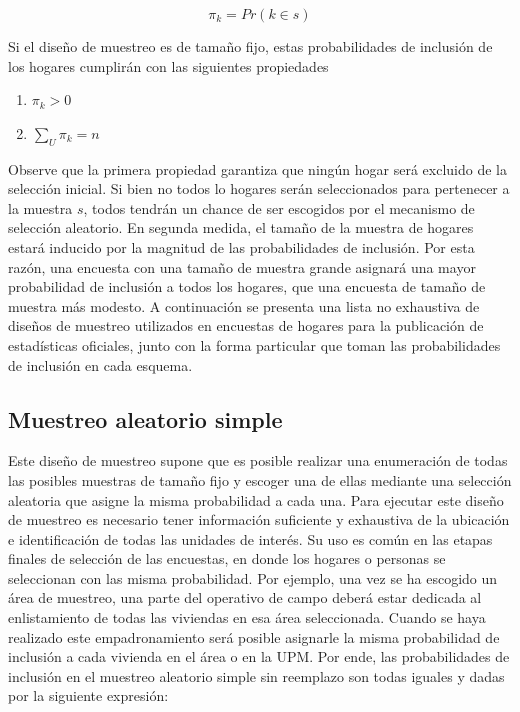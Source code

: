 \documentclass[
  12pt,
  spanish,
]{book}
\providecommand{\tightlist}{%
  \setlength{\itemsep}{0pt}\setlength{\parskip}{0pt}}
\begin{document}
\[\pi_k = Pr (k \in s)\]

Si el diseño de muestreo es de tamaño fijo, estas probabilidades de inclusión de los hogares cumplirán con las siguientes propiedades

\begin{enumerate}
\def\labelenumi{\arabic{enumi}.}
\tightlist
\item
  \(\pi_k > 0\)
\item
  \(\sum_U \pi_k = n\)
\end{enumerate}

Observe que la primera propiedad garantiza que ningún hogar será excluido de la selección inicial. Si bien no todos lo hogares serán seleccionados para pertenecer a la muestra \(s\), todos tendrán un chance de ser escogidos por el mecanismo de selección aleatorio. En segunda medida, el tamaño de la muestra de hogares estará inducido por la magnitud de las probabilidades de inclusión. Por esta razón, una encuesta con una tamaño de muestra grande asignará una mayor probabilidad de inclusión a todos los hogares, que una encuesta de tamaño de muestra más modesto. A continuación se presenta una lista no exhaustiva de diseños de muestreo utilizados en encuestas de hogares para la publicación de estadísticas oficiales, junto con la forma particular que toman las probabilidades de inclusión en cada esquema.

\hypertarget{muestreo-aleatorio-simple}{%
\subsection{Muestreo aleatorio simple}\label{muestreo-aleatorio-simple}}

Este diseño de muestreo supone que es posible realizar una enumeración de todas las posibles muestras de tamaño fijo y escoger una de ellas mediante una selección aleatoria que asigne la misma probabilidad a cada una. Para ejecutar este diseño de muestreo es necesario tener información suficiente y exhaustiva de la ubicación e identificación de todas las unidades de interés. Su uso es común en las etapas finales de selección de las encuestas, en donde los hogares o personas se seleccionan con las misma probabilidad. Por ejemplo, una vez se ha escogido un área de muestreo, una parte del operativo de campo deberá estar dedicada al enlistamiento de todas las viviendas en esa área seleccionada. Cuando se haya realizado este empadronamiento será posible asignarle la misma probabilidad de inclusión a cada vivienda en el área o en la UPM. Por ende, las probabilidades de inclusión en el muestreo aleatorio simple sin reemplazo son todas iguales y dadas por la siguiente expresión:
\end{document}
